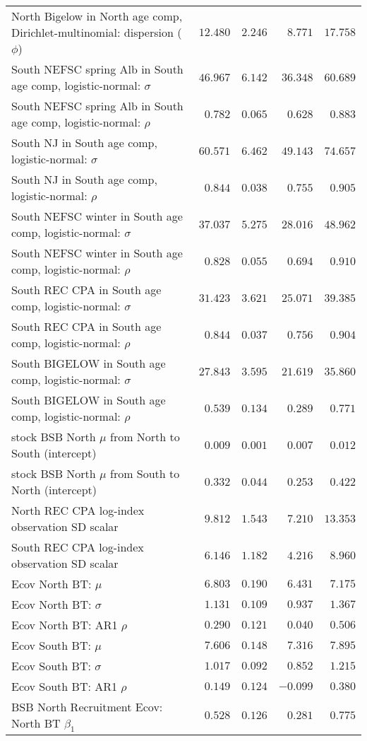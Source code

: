 \documentclass[
]{article}
\begin{document}
\begin{landscape}
\begin{longtable}[t]{lrrrr}
North Bigelow in North age comp, Dirichlet-multinomial: dispersion ($\phi$) & $12.480$ & $2.246$ & $8.771$ & $17.758$\\
South NEFSC spring Alb in South age comp, logistic-normal: $\sigma$ & $46.967$ & $6.142$ & $36.348$ & $60.689$\\
South NEFSC spring Alb in South age comp, logistic-normal: $\rho$ & $0.782$ & $0.065$ & $0.628$ & $0.883$\\
\addlinespace
South NJ in South age comp, logistic-normal: $\sigma$ & $60.571$ & $6.462$ & $49.143$ & $74.657$\\
South NJ in South age comp, logistic-normal: $\rho$ & $0.844$ & $0.038$ & $0.755$ & $0.905$\\
South NEFSC winter in South age comp, logistic-normal: $\sigma$ & $37.037$ & $5.275$ & $28.016$ & $48.962$\\
South NEFSC winter in South age comp, logistic-normal: $\rho$ & $0.828$ & $0.055$ & $0.694$ & $0.910$\\
South REC CPA in South age comp, logistic-normal: $\sigma$ & $31.423$ & $3.621$ & $25.071$ & $39.385$\\
\addlinespace
South REC CPA in South age comp, logistic-normal: $\rho$ & $0.844$ & $0.037$ & $0.756$ & $0.904$\\
South BIGELOW in South age comp, logistic-normal: $\sigma$ & $27.843$ & $3.595$ & $21.619$ & $35.860$\\
South BIGELOW in South age comp, logistic-normal: $\rho$ & $0.539$ & $0.134$ & $0.289$ & $0.771$\\
stock BSB North $\mu$ from North to South (intercept) & $0.009$ & $0.001$ & $0.007$ & $0.012$\\
stock BSB North $\mu$ from South to North (intercept) & $0.332$ & $0.044$ & $0.253$ & $0.422$\\
\addlinespace
North REC CPA log-index observation SD scalar & $9.812$ & $1.543$ & $7.210$ & $13.353$\\
South REC CPA log-index observation SD scalar & $6.146$ & $1.182$ & $4.216$ & $8.960$\\
Ecov North BT: $\mu$ & $6.803$ & $0.190$ & $6.431$ & $7.175$\\
Ecov North BT: $\sigma$ & $1.131$ & $0.109$ & $0.937$ & $1.367$\\
Ecov North BT: AR1 $\rho$ & $0.290$ & $0.121$ & $0.040$ & $0.506$\\
\addlinespace
Ecov South BT: $\mu$ & $7.606$ & $0.148$ & $7.316$ & $7.895$\\
Ecov South BT: $\sigma$ & $1.017$ & $0.092$ & $0.852$ & $1.215$\\
Ecov South BT: AR1 $\rho$ & $0.149$ & $0.124$ & $-0.099$ & $0.380$\\
BSB North Recruitment Ecov: North BT $\beta_1$ & $0.528$ & $0.126$ & $0.281$ & $0.775$\\*
\end{longtable}
\end{landscape}
\end{document}
